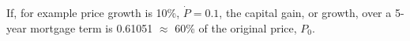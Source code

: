If, for example price growth is 10\%, $\dot P= 0.1$, the {capital gain}, or growth, over a 5-year mortgage term is 0.61051 $\approx$ 60\% of the original price, $P_0$.




